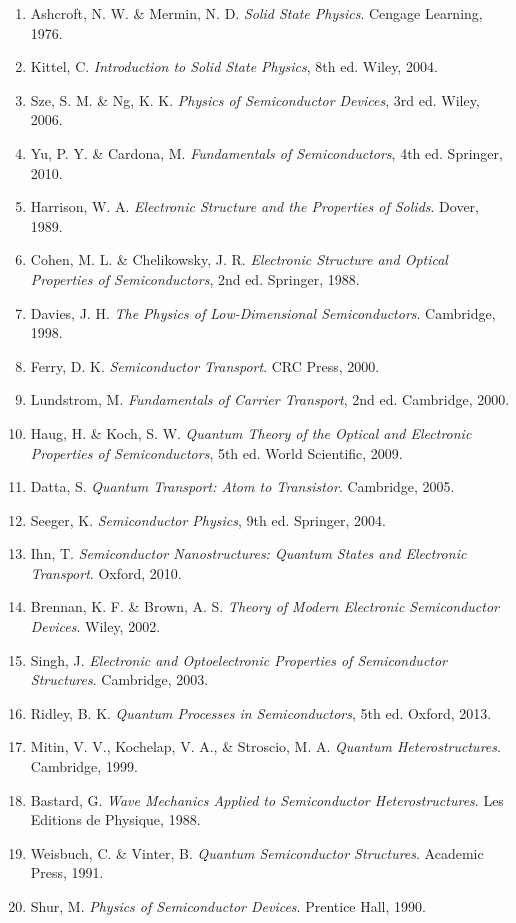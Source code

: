 \documentclass[11pt,a4paper]{article}
\begin{document}
\begin{enumerate}
\item Ashcroft, N. W. \& Mermin, N. D. \textit{Solid State Physics}. Cengage Learning, 1976.
\item Kittel, C. \textit{Introduction to Solid State Physics}, 8th ed. Wiley, 2004.
\item Sze, S. M. \& Ng, K. K. \textit{Physics of Semiconductor Devices}, 3rd ed. Wiley, 2006.
\item Yu, P. Y. \& Cardona, M. \textit{Fundamentals of Semiconductors}, 4th ed. Springer, 2010.
\item Harrison, W. A. \textit{Electronic Structure and the Properties of Solids}. Dover, 1989.
\item Cohen, M. L. \& Chelikowsky, J. R. \textit{Electronic Structure and Optical Properties of Semiconductors}, 2nd ed. Springer, 1988.
\item Davies, J. H. \textit{The Physics of Low-Dimensional Semiconductors}. Cambridge, 1998.
\item Ferry, D. K. \textit{Semiconductor Transport}. CRC Press, 2000.
\item Lundstrom, M. \textit{Fundamentals of Carrier Transport}, 2nd ed. Cambridge, 2000.
\item Haug, H. \& Koch, S. W. \textit{Quantum Theory of the Optical and Electronic Properties of Semiconductors}, 5th ed. World Scientific, 2009.
\item Datta, S. \textit{Quantum Transport: Atom to Transistor}. Cambridge, 2005.
\item Seeger, K. \textit{Semiconductor Physics}, 9th ed. Springer, 2004.
\item Ihn, T. \textit{Semiconductor Nanostructures: Quantum States and Electronic Transport}. Oxford, 2010.
\item Brennan, K. F. \& Brown, A. S. \textit{Theory of Modern Electronic Semiconductor Devices}. Wiley, 2002.
\item Singh, J. \textit{Electronic and Optoelectronic Properties of Semiconductor Structures}. Cambridge, 2003.
\item Ridley, B. K. \textit{Quantum Processes in Semiconductors}, 5th ed. Oxford, 2013.
\item Mitin, V. V., Kochelap, V. A., \& Stroscio, M. A. \textit{Quantum Heterostructures}. Cambridge, 1999.
\item Bastard, G. \textit{Wave Mechanics Applied to Semiconductor Heterostructures}. Les Editions de Physique, 1988.
\item Weisbuch, C. \& Vinter, B. \textit{Quantum Semiconductor Structures}. Academic Press, 1991.
\item Shur, M. \textit{Physics of Semiconductor Devices}. Prentice Hall, 1990.
\end{enumerate}
\end{document}
